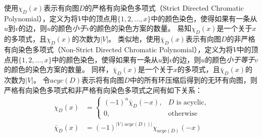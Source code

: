 \documentclass[12pt,UTF8,AutoFakeBold=3,a4paper]{ctexart} %
\begin{document}
使用$\chi_D(x)$表示有向图$D$的严格有向染色多项式（Strict Directed Chromatic Polynomial），定义为将$V$中的顶点用$\{1, 2, \dots, x\}$中的颜色染色，使得如果有一条从$u$到$v$的边，则$u$的颜色\emph{小于}$v$的颜色的染色方案的数量。
易知$\chi_D(x)$是一个关于$x$的多项式，且$\chi_D(x)$的次数为$|V|$。
类似地，使用$\bar \chi_D(x)$表示有向图$D$的非严格有向染色多项式（Non-Strict Directed Chromatic Polynomial），定义为将$V$中的顶点用$\{1, 2, \dots, x\}$中的颜色染色，使得如果有一条从$u$到$v$的边，则$u$的颜色\emph{小于等于}$v$的颜色的染色方案的数量。
同样，$\bar \chi_D(x)$是一个关于$x$的多项式，且$\bar \chi_D(x)$的次数为$|V|$。
令$acyc(D)$表示将有向图$D$中的所有环压缩后得到的无环有向图，则严格有向染色多项式和非严格有向染色多项式之间有如下关系：
\begin{equation*}
\begin{aligned}
\chi_D(x) &= \begin{cases}
    (-1)^n \bar \chi_D(-x), & D \text{ is acyclic,} \\
    0, & \text{otherwise}
    \end{cases} \\
\bar \chi_D(x) &= (-1)^{|V(acyc(D))|} \chi_{acyc(D)}(-x)
\end{aligned}
\end{equation*}
\end{document}
